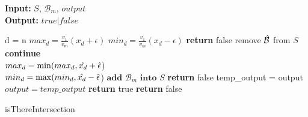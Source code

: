 \documentclass[10pt, conference, compsocconf]{IEEEtran}
\begin{document}
\begin{algorithm}
    \begin{flushleft}
        \textbf{Input:} $S$, $\mathcal{B}_m$, $output$ \\
        \textbf{Output:} $true|false$\\
    \end{flushleft}
    \begin{algorithmic}[1]
        \State d = n 
        \State $max_d = \frac{v_1}{v_m}(x_d + \epsilon)$
        \State $min_d = \frac{v_1}{v_m}(x_d - \epsilon)$
                \State \textbf{return} false
                \State remove $\Hat{\mathcal{B}}$ from $S$
                \State \textbf{continue}\\
            $max_d = \min(max_d, \Hat{x_d} + \Hat{\epsilon}$)\\
            $min_d = \max(min_d, \Hat{x_d} - \Hat{\epsilon}$)
            \EndIf
        \EndFor
        \State $\textbf{add } \mathcal{B}_m \textbf{ into } S$
            \State \textbf{return} false
        \EndIf
        \State temp\_output = output 
            \State $output = temp\_output$
            \State \textbf{return} true
        \Else
            \State \textbf{return} false
        \EndIf
    \end{algorithmic}
    \caption{isThereIntersection}
    \label{algo:isThereIntersection}
\end{algorithm}

\end{document}
